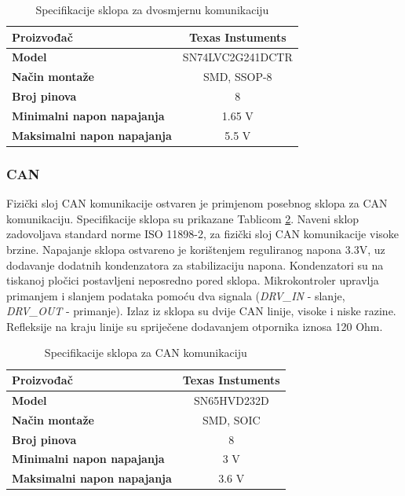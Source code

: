 \documentclass[11pt,a4paper]{article}
\begin{document}
\begin{table}[H]
	\centering
	\caption{Specifikacije sklopa za dvosmjernu komunikaciju}
	\label{tab:specifikacija_dynamixel_buffer}
	\begin{tabular}{|l|c|}
		\hline
		\textbf{Proizvođač} & Texas Instuments \\ \hline 
		\textbf{Model} & SN74LVC2G241DCTR \\ \hline 
		\textbf{Način montaže} & SMD, SSOP-8 \\ \hline 
		\textbf{Broj pinova} & 8 \\ \hline 
		\textbf{Minimalni napon napajanja} & 1.65 V \\ \hline 
		\textbf{Maksimalni napon napajanja} & 5.5 V    \\ \hline
	\end{tabular}
\end{table}


\subsubsection{CAN}
Fizički sloj CAN komunikacije ostvaren je primjenom posebnog sklopa za CAN komunikaciju. Specifikacije sklopa su prikazane Tablicom \ref{tab:specifikacija_CAN_bus}. Naveni sklop zadovoljava standard norme ISO 11898-2, za fizički sloj CAN komunikacije visoke brzine. Napajanje sklopa ostvareno je korištenjem reguliranog napona 3.3V, uz dodavanje dodatnih kondenzatora za stabilizaciju napona. Kondenzatori su na tiskanoj pločici postavljeni neposredno pored sklopa. Mikrokontroler upravlja primanjem i slanjem podataka pomoću dva signala (\textit{DRV\_IN} - slanje, \textit{DRV\_OUT} - primanje). Izlaz iz sklopa su dvije CAN linije, visoke i niske razine. Refleksije na kraju linije su spriječene dodavanjem otpornika iznosa 120 Ohm.

\begin{table}[H]
	\centering
	\caption{Specifikacije sklopa za CAN komunikaciju}
	\label{tab:specifikacija_CAN_bus}
	\begin{tabular}{|l|c|}
		\hline
		\textbf{Proizvođač} & Texas Instuments \\ \hline 
		\textbf{Model} &  SN65HVD232D \\ \hline 
		\textbf{Način montaže} & SMD, SOIC \\ \hline 
		\textbf{Broj pinova} & 8 \\ \hline 
		\textbf{Minimalni napon napajanja} & 3 V \\ \hline 
		\textbf{Maksimalni napon napajanja} & 3.6 V    \\ \hline
	\end{tabular}
\end{table}
\end{document}
